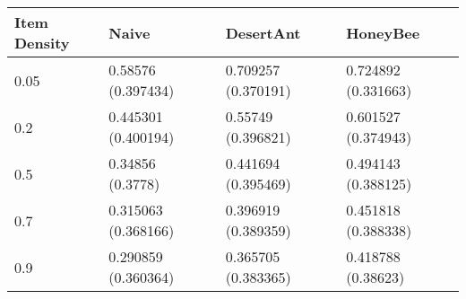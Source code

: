 \begin{tabular} {|l|l|l|l|}
\hline
Item Density & Naive & DesertAnt & HoneyBee \\
\hline
0.05 & 0.58576 (0.397434)  & 0.709257 (0.370191)  & 0.724892 (0.331663)  \\
0.2 & 0.445301 (0.400194)  & 0.55749 (0.396821)  & 0.601527 (0.374943)  \\
0.5 & 0.34856 (0.3778)  & 0.441694 (0.395469)  & 0.494143 (0.388125)  \\
0.7 & 0.315063 (0.368166)  & 0.396919 (0.389359)  & 0.451818 (0.388338)  \\
0.9 & 0.290859 (0.360364)  & 0.365705 (0.383365)  & 0.418788 (0.38623)  \\
\hline
\end{tabular}
